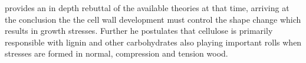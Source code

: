\citet{ISI:A1950XU10300003} provides an in depth rebuttal of the available theories at that
time, arriving at the conclusion the the cell wall development must control the shape
change which results in growth stresses. Further he postulates that cellulose
is primarily responsible with lignin and other carbohydrates also playing important
rolls when stresses are formed in normal, compression and tension wood. 